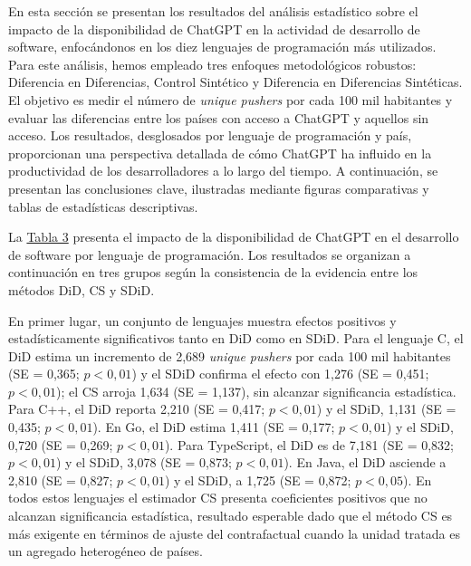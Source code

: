 \documentclass[12pt,a4paper]{article}
\begin{document}
En esta sección se presentan los resultados del análisis estadístico sobre el impacto de la disponibilidad de ChatGPT en la actividad de desarrollo de software, enfocándonos en los diez lenguajes de programación más utilizados. Para este análisis, hemos empleado tres enfoques metodológicos robustos: Diferencia en Diferencias, Control Sintético y Diferencia en Diferencias Sintéticas. El objetivo es medir el número de \textit{unique pushers} por cada 100 mil habitantes y evaluar las diferencias entre los países con acceso a ChatGPT y aquellos sin acceso. Los resultados, desglosados por lenguaje de programación y país, proporcionan una perspectiva detallada de cómo ChatGPT ha influido en la productividad de los desarrolladores a lo largo del tiempo. A continuación, se presentan las conclusiones clave, ilustradas mediante figuras comparativas y tablas de estadísticas descriptivas.

La \hyperref[tab:tabla3]{Tabla 3} presenta el impacto de la disponibilidad de ChatGPT en el desarrollo de software por lenguaje de programación. Los resultados se organizan a continuación en tres grupos según la consistencia de la evidencia entre los métodos DiD, CS y SDiD.

En primer lugar, un conjunto de lenguajes muestra efectos positivos y estadísticamente significativos tanto en DiD como en SDiD. Para el lenguaje C, el DiD estima un incremento de 2,689 \textit{unique pushers} por cada 100 mil habitantes (SE = 0,365; $p<0{,}01$) y el SDiD confirma el efecto con 1,276 (SE = 0,451; $p<0{,}01$); el CS arroja 1,634 (SE = 1,137), sin alcanzar significancia estadística. Para C++, el DiD reporta 2,210 (SE = 0,417; $p<0{,}01$) y el SDiD, 1,131 (SE = 0,435; $p<0{,}01$). En Go, el DiD estima 1,411 (SE = 0,177; $p<0{,}01$) y el SDiD, 0,720 (SE = 0,269; $p<0{,}01$). Para TypeScript, el DiD es de 7,181 (SE = 0,832; $p<0{,}01$) y el SDiD, 3,078 (SE = 0,873; $p<0{,}01$). En Java, el DiD asciende a 2,810 (SE = 0,827; $p<0{,}01$) y el SDiD, a 1,725 (SE = 0,872; $p<0{,}05$). En todos estos lenguajes el estimador CS presenta coeficientes positivos que no alcanzan significancia estadística, resultado esperable dado que el método CS es más exigente en términos de ajuste del contrafactual cuando la unidad tratada es un agregado heterogéneo de países.
\end{document}
